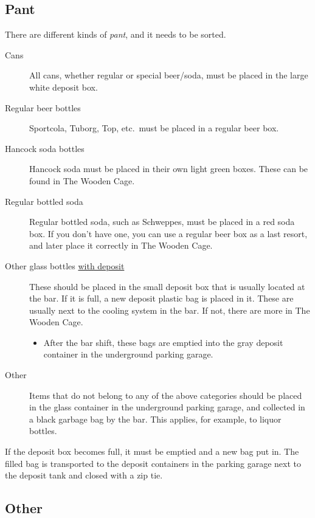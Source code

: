 \subsection{Pant}
\label{sec:intra:pant}

There are different kinds of \textit{pant}, and it needs to be sorted.
\begin{description}
    \item[Cans] All cans, whether regular or special
    beer/soda, must be placed in the large white deposit box.
    \item[Regular beer bottles] Sportcola, Tuborg, Top, etc.\ must be placed in a regular beer box.
    \item[Hancock soda bottles] Hancock soda must be placed in their own light green boxes. These can be found in The Wooden Cage.
    \item[Regular bottled soda] Regular bottled soda, such as Schweppes, must be placed in a
    red soda box. If you don't have one, you can use a regular beer box as a last resort, and later place it correctly in The Wooden Cage.
    \item[Other glass bottles \underline{with deposit}] These should be placed in the small deposit box that is usually located at the bar.
    If it is full, a new deposit plastic bag is placed in it. These are usually next to the cooling system in the bar.
    If not, there are more in The Wooden Cage.
    \begin{itemize}
        \item After the bar shift, these bags are emptied into the gray deposit container in the underground parking garage.
    \end{itemize}
    \item[Other] Items that do not belong to any of the above
    categories should be placed in the glass container in the underground parking garage,
    and collected in a black garbage bag by the bar. This applies, for example, to liquor bottles.
\end{description}

If the deposit box becomes full, it must be emptied and a new bag put in.
The filled bag is transported to the deposit containers in the parking garage 
next to the deposit tank and closed with a zip tie.

\subsection{Other}
\label{sec:intra:other}

